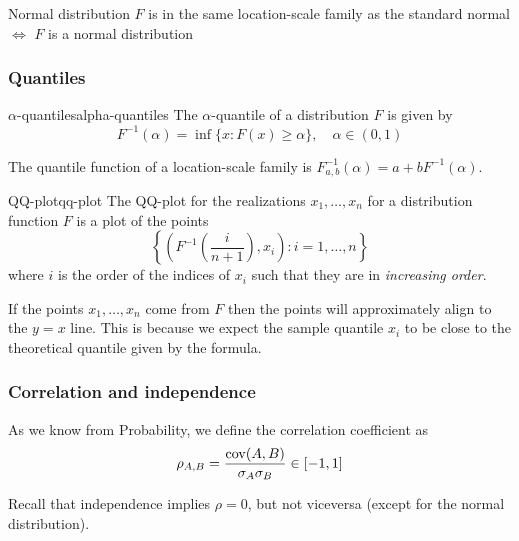 \documentclass[12pt]{extarticle}
\begin{document}
\begin{example}{Normal distribution}{}
	$F$ is in the same location-scale family as the standard normal $\iff$ $F$ is a normal distribution
\end{example}

\subsubsection{Quantiles}

\begin{definition}{$\alpha$-quantiles}{alpha-quantiles}
	The $\alpha$-quantile of a distribution $F$ is given by
	\begin{equation}
		F^{-1}(\alpha) = \inf\{ x: F(x) \geq \alpha \}, \quad \alpha \in (0, 1)
	\end{equation}
\end{definition}

The quantile function of a location-scale family is
$F_{a, b}^{-1}(\alpha) = a + bF^{-1}(\alpha)$.

\begin{definition}{QQ-plot}{qq-plot}
	The QQ-plot for the realizations $x_1, \dots, x_n$ for a distribution function $F$ is a plot of the points
	\begin{equation}
		\left\{ \left( F^{-1}\left( \frac{i}{n+1} \right), x_i \right) : i = 1, \dots, n \right\}
	\end{equation}
	where $i$ is the order of the indices of $x_i$ such that they are in \textit{increasing order}.
\end{definition}

If the points $x_1, \dots, x_n$ come from $F$ then the points will approximately align to the $y = x$ line.
This is because we expect the sample quantile $x_i$ to be close to the theoretical quantile given by the formula.

\subsubsection{Correlation and independence}

As we know from Probability, we define the correlation coefficient as
\begin{equation}
	\rho_{A,B} = \frac{\cov(A, B)}{\sigma_A \sigma_B} \in [-1, 1]
\end{equation}

Recall that independence implies $\rho = 0$, but not viceversa (except for the normal distribution).
\end{document}
